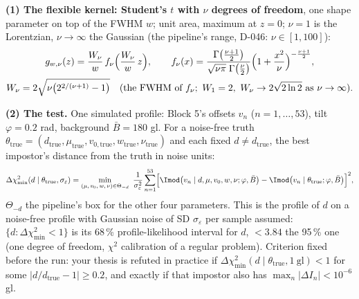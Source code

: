 \textbf{(1) The flexible kernel: Student's $t$ with $\nu$ degrees of freedom}, one shape parameter on top of the FWHM $w$; unit area, maximum at $z=0$; $\nu=1$ is the Lorentzian, $\nu\to\infty$ the Gaussian (the pipeline's range, D-046: $\nu\in[1,100]$):
\begin{gather*}
g_{w,\nu}(z)=\frac{W_\nu}{w}\,f_\nu\Bigl(\frac{W_\nu}{w}\,z\Bigr),\qquad
f_\nu(x)=\frac{\Gamma\bigl(\tfrac{\nu+1}{2}\bigr)}{\sqrt{\nu\pi}\;\Gamma\bigl(\tfrac{\nu}{2}\bigr)}\Bigl(1+\frac{x^{2}}{\nu}\Bigr)^{-\frac{\nu+1}{2}},\\
W_\nu=2\sqrt{\nu\bigl(2^{2/(\nu+1)}-1\bigr)}\quad(\text{the FWHM of } f_\nu;\ W_1=2,\ W_\nu\to2\sqrt{2\ln2}\ \text{as}\ \nu\to\infty).
\end{gather*}

\medskip
\textbf{(2) The test.} One simulated profile: Block 5's offsets $v_n$ ($n=1,\dots,53$), tilt $\varphi=0.2$ rad, background $\bar B=180$ gl. For a noise-free truth $\theta_{\mathrm{true}}=(d_{\mathrm{true}},\mu_{\mathrm{true}},v_{0,\mathrm{true}},w_{\mathrm{true}},\nu_{\mathrm{true}})$ and each fixed $d\neq d_{\mathrm{true}}$, the best impostor's distance from the truth in noise units:
\begin{equation*}
\Delta\chi^2_{\min}(d\mid\theta_{\mathrm{true}},\sigma_\varepsilon)=\min_{(\mu,\,v_0,\,w,\,\nu)\in\Theta_{-d}}\ \frac{1}{\sigma_\varepsilon^{2}}\sum_{n=1}^{53}\Bigl[\Imod\bigl(v_n\mid d,\mu,v_0,w,\nu;\varphi,\bar B\bigr)-\Imod\bigl(v_n\mid\theta_{\mathrm{true}};\varphi,\bar B\bigr)\Bigr]^{2},
\end{equation*}
$\Theta_{-d}$ the pipeline's box for the other four parameters. This is the profile of $d$ on a noise-free profile with Gaussian noise of SD $\sigma_\varepsilon$ per sample assumed: $\{d:\Delta\chi^2_{\min}<1\}$ is its 68\,\% profile-likelihood interval for $d$, $<3.84$ the 95\,\% one (one degree of freedom, $\chi^2$ calibration of a regular problem). Criterion fixed before the run: your thesis is refuted in practice if $\Delta\chi^2_{\min}(d\mid\theta_{\mathrm{true}},1\ \mathrm{gl})<1$ for some $\lvert d/d_{\mathrm{true}}-1\rvert\ge0.2$, and exactly if that impostor also has $\max_n\lvert\Delta I_n\rvert<10^{-6}$ gl.


